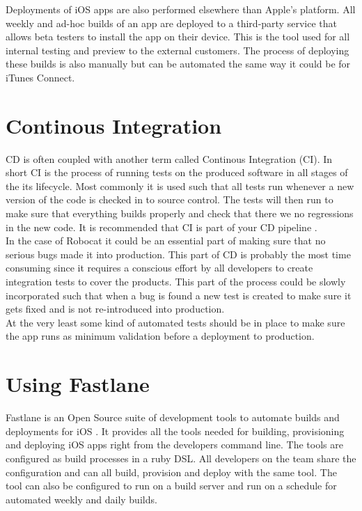 \documentclass{ituthesis}
\begin{document}
Deployments of iOS apps are also performed elsewhere than Apple's platform. All weekly and ad-hoc builds of an app are deployed to a third-party service that allows beta testers to install the app on their device. This is the tool used for all internal testing and preview to the external customers. The process of deploying these builds is also manually but can be automated the same way it could be for iTunes Connect.

\section{Continous Integration}

CD is often coupled with another term called Continous Integration (CI). In short CI is the process of running tests on the produced software in all stages of the its lifecycle. Most commonly it is used such that all tests run whenever a new version of the code is checked in to source control. The tests will then run to make sure that everything builds properly and check that there we no regressions in the new code. It is recommended that CI is part of your CD pipeline \cite{Humble2010} \cite{Chen2015}.\\

In the case of Robocat it could be an essential part of making sure that no serious bugs made it into production. This part of CD is probably the most time consuming since it requires a conscious effort by all developers to create integration tests to cover the products. This part of the process could be slowly incorporated such that when a bug is found a new test is created to make sure it gets fixed and is not re-introduced into production.\\

At the very least some kind of automated tests should be in place to make sure the app runs as minimum validation before a deployment to production.

\section{Using Fastlane}
\label{sec:using_fastlane}

Fastlane is an Open Source suite of development tools to automate builds and deployments for iOS \cite{Krause2015}. It provides all the tools needed for building, provisioning and deploying iOS apps right from the developers command line. The tools are configured as build processes in a ruby DSL. All developers on the team share the configuration and can all build, provision and deploy with the same tool. The tool can also be configured to run on a build server and run on a schedule for automated weekly and daily builds.\\
\end{document}
